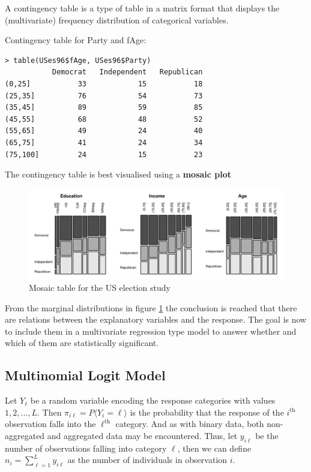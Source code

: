 \documentclass[11pt]{article}
\begin{document}
A contingency table is a type of table in a matrix format that displays the (multivariate) frequency distribution of categorical variables.

Contingency table for Party and fAge:
\begin{verbatim}
> table(USes96$fAge, USes96$Party)
           Democrat   Independent   Republican
(0,25]           33            15           18
(25,35]          76            54           73
(35,45]          89            59           85
(45,55]          68            48           52
(55,65]          49            24           40
(65,75]          41            24           34
(75,100]         24            15           23
\end{verbatim}

\noindent
The contingency table is best visualised using a \textbf{mosaic plot}

\begin{figure}[H]
	\centering
	\includegraphics[width=0.9\linewidth, keepaspectratio]{img/mosaic_plot}
	\caption{Mosaic table for the US election study}
	\label{fig:mosaicplot}
\end{figure}

From the marginal distributions in figure \ref{fig:mosaicplot} the conclusion is reached that there are relations between the explanatory variables and the response. The goal is now to include them in a multivariate regression type model to answer whether and which of them are statistically significant.

\subsection{Multinomial Logit Model}

Let $Y_\ell$ be a random variable encoding the response categories with values $1,2,..., L$. Then $\pi_{i\ell} = P\langle Y_i = \ell\rangle$ is the probability that the response of the $i^{\text{th}}$ observation falls into the $\ell^{\text{th}}$ category. And as with binary data, both non-aggregated and aggregated data may be encountered. Thus, let $y_{i\ell}$ be the number of observations falling into category $\ell$, then we can define $ n_i = \sum_{\ell=1}^{L} y_{i\ell}$ as the number of individuals in observation $i$.
\end{document}
